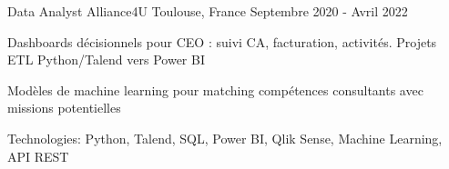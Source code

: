 \begin{cventries}
\cventry
{Data Analyst} %
{Alliance4U} %
{Toulouse, France} %
{Septembre 2020 - Avril 2022} %
{ %
\begin{cvitems}
\item {Dashboards décisionnels pour CEO : suivi CA, facturation, activités. Projets ETL Python/Talend vers Power BI}
\item {Modèles de machine learning pour matching compétences consultants avec missions potentielles}
\item {Technologies: Python, Talend, SQL, Power BI, Qlik Sense, Machine Learning, API REST}
\end{cvitems}
}
\vspace{1.5em}


\end{cventries}